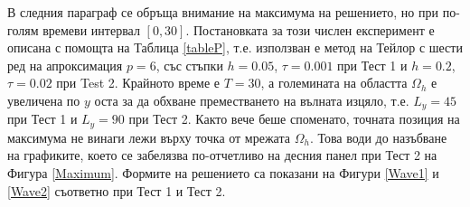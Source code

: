 \documentclass{article}
\begin{document}
В следния параграф се обръща внимание на максимума на решението, но при по-голям времеви интервал $[0, 30]$. Постановката за този числен експеримент е описана с помощта на Таблица \ref{tableP}, т.е. използван е метод на Тейлор с шести ред на апроксимация $p=6$, със стъпки $h=0.05$, $\tau = 0.001$ при Тест 1 и $h=0.2$,  $\tau=0.02$ при Test 2. Крайното време е $T=30$, а големината на областта $\Omega_h$ е увеличена по $y$ оста за да обхване преместването на вълната изцяло, т.е. $L_y = 45$ при Тест 1 и $L_y = 90$ при Тест 2. Както вече беше споменато, точната позиция на максимума не винаги лежи върху точка от мрежата $\Omega_h$. Това води до назъбване на графиките, което се забелязва по-отчетливо на десния панел при Тест 2 на Фигура \ref{Maximum}. Формите на решението са показани на Фигури \ref{Wave1} и \ref{Wave2} съответно при Тест 1 и Тест 2.
\end{document}
